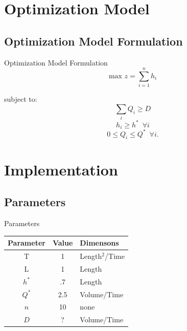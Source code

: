 \documentclass[xcolor=x11names,compress]{beamer}
\renewcommand{\(}{\begin{columns}}
\renewcommand{\)}{\end{columns}}
\newcommand{\<}[1]{\begin{column}{#1}}
\renewcommand{\>}{\end{column}}
\begin{document}
\section{Optimization Model}
\subsection{Optimization Model Formulation}
\begin{frame}{Optimization Model Formulation}
$$\mbox{max}\,\,z=\sum_{i=1}^nh_i$$

subject to: 
\pause
$$\sum_iQ_i\geq D $$
\pause
$$h_i \geq h^* \,\,\,\forall i $$
\pause
$$0 \leq Q_i\leq Q^* \,\,\, \forall i.$$
\end{frame}

\section{Implementation}
\subsection{Parameters}
\begin{frame}{Parameters}
\begin{center}
\begin{tabular}{ccl}
\toprule
Parameter & Value & Dimensons\\
\midrule
T & 1 & Length$^2$/Time\\
L & 1 & Length\\
$h^*$ & .7 & Length\\
$Q^*$ & 2.5 & Volume/Time\\
$n$ & 10 & none\\
$D$ & ? & Volume/Time\\
\bottomrule
\end{tabular}
\end{center}
\end{frame}

\end{document}
